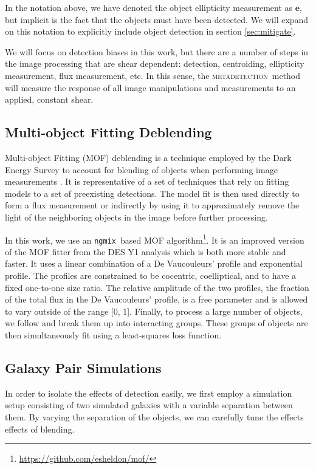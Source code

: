 \documentclass[fleqn,useAMS,usenatbib]{mnras}
\newcommand{\ngmix}{\texttt{ngmix}}
\newcommand{\mdet}{\textsc{metadetection}}
\begin{document}
In the notation above, we have denoted the object ellipticity measurement as
$\boldsymbol{e}$, but implicit is the fact that the objects must have been
detected.  We will expand on this notation to explicitly include object
detection in section \ref{sec:mitigate}.

We will focus on detection biases in this work, but there are a number of steps
in the image processing that are shear dependent: detection, centroiding,
ellipticity measurement, flux measurement, etc.  In this sense, the \mdet\
method will measure the response of all image manipulations and measurements to
an applied, constant shear.

\subsection{Multi-object Fitting Deblending}

Multi-object Fitting (MOF) deblending is a technique employed by the Dark
Energy Survey to account for blending of objects when performing image
measurements \citep{DESY1cat}. It is representative of a set of techniques that
rely on fitting models to a set of preexisting detections. The model fit is
then used directly to form a flux measurement or indirectly by using it to
approximately remove the light of the neighboring objects in the image before
further processing.

In this work, we use an \ngmix\ based MOF
algorithm\footnote{\url{https://github.com/esheldon/mof/}}. It is an improved
version of the MOF fitter from the DES Y1 analysis which is both more stable
and faster. It uses a linear combination of a De Vaucouleurs'
\citep{devauc1948} profile and exponential profile. The profiles are
constrained to be cocentric, coelliptical, and to have a fixed one-to-one size
ratio.  The relative amplitude of the two profiles, the fraction of the total
flux in the De Vaucouleurs' profile, is a free parameter and is allowed to vary
outside of the range [0, 1]. Finally, to process a large number of objects, we
follow \citet{DESY1cat} and break them up into interacting groups.  These
groups of objects are then simultaneously fit using a least-squares loss
function.

\subsection{Galaxy Pair Simulations}
\label{sec:sims:pairs}

In order to isolate the effects of detection easily, we first employ a
simulation setup consisting of two simulated galaxies with a variable
separation between them. By varying the separation of the objects, we can
carefully tune the effects effects of blending.
\end{document}
